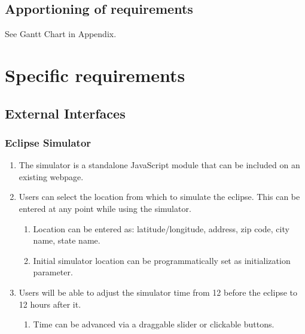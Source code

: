 \documentclass[10pt, onecolumn, draftclsnofoot, letterpaper, compsoc]{IEEEtran}
\begin{document}
\subsection{Apportioning of requirements}
See Gantt Chart in Appendix.
	

\newpage
\section{Specific requirements}

\subsection{External Interfaces}

\subsubsection{Eclipse Simulator}
	\begin{enumerate}
		\item The simulator is a standalone JavaScript module that can
		be included on an existing webpage.

		\item Users can select the location from which to simulate the eclipse. 
		This can be entered at any point while using the simulator.
		\begin{enumerate}
			\item Location can be entered as: latitude/longitude, address, zip code, 
			city name, state name.
			\item Initial simulator location can be programmatically set as 
			initialization parameter.
		\end{enumerate}

		\item Users will be able to adjust the simulator time from 12 before 
		the eclipse to 12 hours after it.
		\begin{enumerate}
			\item Time can be advanced via a draggable slider or clickable buttons.
		\end{enumerate}

	\end{enumerate}
\end{document}
